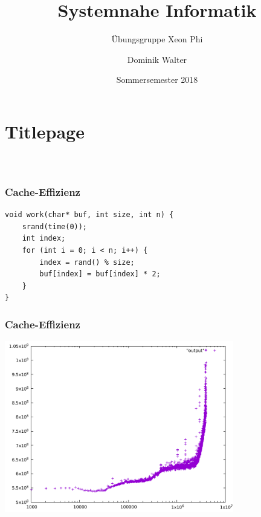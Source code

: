 \documentclass[xcolor=pdftex,dvipsnames,table]{beamer}
\title{Systemnahe Informatik}
\subtitle{Übungsgruppe Xeon Phi}
\author{Dominik Walter}
\date{Sommersemester 2018}
\begin{document}
\section*{Titlepage}
\begin{frame}
  \frametitle{\ }
  \titlepage
\end{frame}


\begin{frame}[fragile]
	\frametitle{Cache-Effizienz}
		\begin{lstlisting}
void work(char* buf, int size, int n) {
	srand(time(0));
	int index;
	for (int i = 0; i < n; i++) {
		index = rand() % size;
		buf[index] = buf[index] * 2;
	}
}
		\end{lstlisting}
\end{frame}

\begin{frame}
	\frametitle{Cache-Effizienz}

	\includegraphics[width=10cm]{cache.pdf}
\end{frame}
\end{document}
